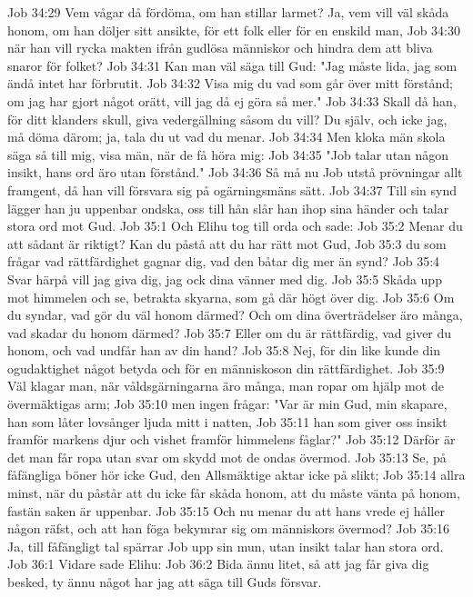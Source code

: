 Job 34:29  Vem vågar då fördöma, om han stillar larmet? Ja, vem vill väl skåda honom, om han döljer sitt ansikte, för ett folk eller för en enskild man,
Job 34:30  när han vill rycka makten ifrån gudlösa människor och hindra dem att bliva snaror för folket?
Job 34:31  Kan man väl säga till Gud: "Jag måste lida, jag som ändå intet har förbrutit.
Job 34:32  Visa mig du vad som går över mitt förstånd; om jag har gjort något orätt, vill jag då ej göra så mer."
Job 34:33  Skall då han, för ditt klanders skull, giva vedergällning såsom du vill? Du själv, och icke jag, må döma därom; ja, tala du ut vad du menar.
Job 34:34  Men kloka män skola säga så till mig, visa män, när de få höra mig:
Job 34:35  "Job talar utan någon insikt, hans ord äro utan förstånd."
Job 34:36  Så må nu Job utstå prövningar allt framgent, då han vill försvara sig på ogärningsmäns sätt.
Job 34:37  Till sin synd lägger han ju uppenbar ondska, oss till hån slår han ihop sina händer och talar stora ord mot Gud.
Job 35:1  Och Elihu tog till orda och sade:
Job 35:2  Menar du att sådant är riktigt? Kan du påstå att du har rätt mot Gud,
Job 35:3  du som frågar vad rättfärdighet gagnar dig, vad den båtar dig mer än synd?
Job 35:4  Svar härpå vill jag giva dig, jag ock dina vänner med dig.
Job 35:5  Skåda upp mot himmelen och se, betrakta skyarna, som gå där högt över dig.
Job 35:6  Om du syndar, vad gör du väl honom därmed? Och om dina överträdelser äro många, vad skadar du honom därmed?
Job 35:7  Eller om du är rättfärdig, vad giver du honom, och vad undfår han av din hand?
Job 35:8  Nej, för din like kunde din ogudaktighet något betyda och för en människoson din rättfärdighet.
Job 35:9  Väl klagar man, när våldsgärningarna äro många, man ropar om hjälp mot de övermäktigas arm;
Job 35:10  men ingen frågar: "Var är min Gud, min skapare, han som låter lovsånger ljuda mitt i natten,
Job 35:11  han som giver oss insikt framför markens djur och vishet framför himmelens fåglar?"
Job 35:12  Därför är det man får ropa utan svar om skydd mot de ondas övermod.
Job 35:13  Se, på fåfängliga böner hör icke Gud, den Allsmäktige aktar icke på slikt;
Job 35:14  allra minst, när du påstår att du icke får skåda honom, att du måste vänta på honom, fastän saken är uppenbar.
Job 35:15  Och nu menar du att hans vrede ej håller någon räfst, och att han föga bekymrar sig om människors övermod?
Job 35:16  Ja, till fåfängligt tal spärrar Job upp sin mun, utan insikt talar han stora ord.
Job 36:1  Vidare sade Elihu:
Job 36:2  Bida ännu litet, så att jag får giva dig besked, ty ännu något har jag att säga till Guds försvar.
